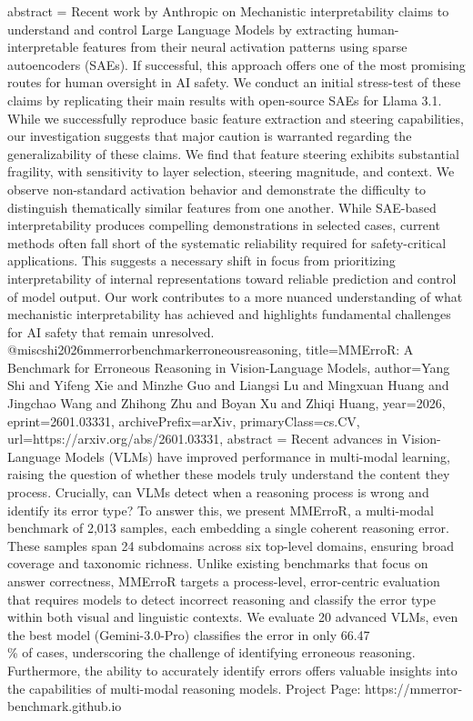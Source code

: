 {      abstract = {Recent work by Anthropic on Mechanistic interpretability claims to understand and control Large Language Models by extracting human-interpretable features from their neural activation patterns using sparse autoencoders (SAEs). If successful, this approach offers one of the most promising routes for human oversight in AI safety. We conduct an initial stress-test of these claims by replicating their main results with open-source SAEs for Llama 3.1. While we successfully reproduce basic feature extraction and steering capabilities, our investigation suggests that major caution is warranted regarding the generalizability of these claims. We find that feature steering exhibits substantial fragility, with sensitivity to layer selection, steering magnitude, and context. We observe non-standard activation behavior and demonstrate the difficulty to distinguish thematically similar features from one another. While SAE-based interpretability produces compelling demonstrations in selected cases, current methods often fall short of the systematic reliability required for safety-critical applications. This suggests a necessary shift in focus from prioritizing interpretability of internal representations toward reliable prediction and control of model output. Our work contributes to a more nuanced understanding of what mechanistic interpretability has achieved and highlights fundamental challenges for AI safety that remain unresolved.}
}@misc{shi2026mmerrorbenchmarkerroneousreasoning,
      title={MMErroR: A Benchmark for Erroneous Reasoning in Vision-Language Models}, 
      author={Yang Shi and Yifeng Xie and Minzhe Guo and Liangsi Lu and Mingxuan Huang and Jingchao Wang and Zhihong Zhu and Boyan Xu and Zhiqi Huang},
      year={2026},
      eprint={2601.03331},
      archivePrefix={arXiv},
      primaryClass={cs.CV},
      url={https://arxiv.org/abs/2601.03331},
      abstract = {Recent advances in Vision-Language Models (VLMs) have improved performance in multi-modal learning, raising the question of whether these models truly understand the content they process. Crucially, can VLMs detect when a reasoning process is wrong and identify its error type? To answer this, we present MMErroR, a multi-modal benchmark of 2,013 samples, each embedding a single coherent reasoning error. These samples span 24 subdomains across six top-level domains, ensuring broad coverage and taxonomic richness. Unlike existing benchmarks that focus on answer correctness, MMErroR targets a process-level, error-centric evaluation that requires models to detect incorrect reasoning and classify the error type within both visual and linguistic contexts. We evaluate 20 advanced VLMs, even the best model (Gemini-3.0-Pro) classifies the error in only 66.47\\\% of cases, underscoring the challenge of identifying erroneous reasoning. Furthermore, the ability to accurately identify errors offers valuable insights into the capabilities of multi-modal reasoning models. Project Page: https://mmerror-benchmark.github.io}
}
